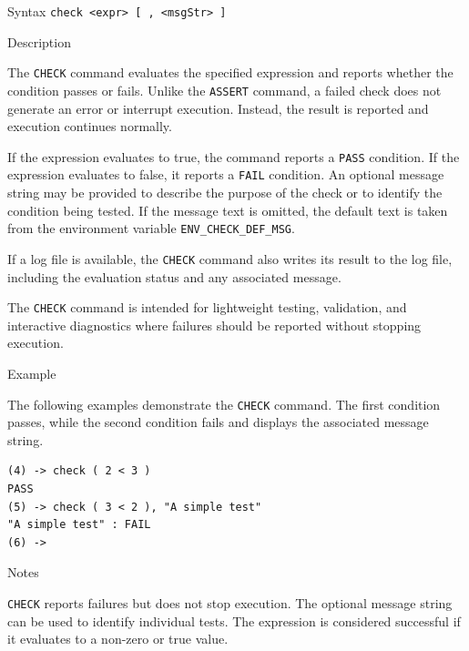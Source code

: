 %
%
\pagebreak
{}

\begin{iPageDescEntry}{Syntax}
\texttt{check  <expr>  [ , <msgStr> ]}
\end{iPageDescEntry}

\begin{iPageDescEntry}{Description}

The \texttt{CHECK} command evaluates the specified expression and reports whether the condition passes or fails. Unlike the \texttt{ASSERT} command, a failed check does not generate an error or interrupt execution. Instead, the result is reported and execution continues normally.

If the expression evaluates to true, the command reports a \texttt{PASS} condition. If the expression evaluates to false, it reports a \texttt{FAIL} condition. An optional message string may be provided to describe the purpose of the check or to identify the condition being tested. If the message text is omitted, the default text is taken from the environment variable \texttt{ENV\_CHECK\_DEF\_MSG}.

If a log file is available, the \texttt{CHECK} command also writes its result to the log file, including the evaluation status and any associated message.

The \texttt{CHECK} command is intended for lightweight testing, validation, and interactive diagnostics where failures should be reported without stopping execution.

\end{iPageDescEntry}


\begin{iPageDescEntry}{Example}

The following examples demonstrate the \texttt{CHECK} command. The first condition passes, while the second condition fails and displays the associated message string.

\begin{lstlisting}[style=iPageOpStyle]
(4) -> check ( 2 < 3 )
PASS
(5) -> check ( 3 < 2 ), "A simple test"
"A simple test" : FAIL
(6) ->
\end{lstlisting}
\end{iPageDescEntry}

\begin{iPageDescEntry}{Notes}

\texttt{CHECK} reports failures but does not stop execution. The optional message string can be used to identify individual tests. The expression is considered successful if it evaluates to a non-zero or true value.

\end{iPageDescEntry}